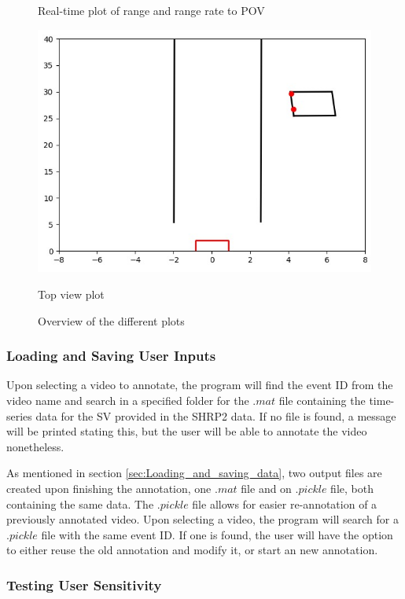 \begin{figure}[H]
\begin{minipage}[b]{0.45\linewidth}
    \caption*{Real-time plot of range and range rate to POV}
\end{minipage}
\begin{minipage}[b]{0.45\linewidth}
    \includegraphics[width=\textwidth]{Figures/GUI_all_inputs_2d.jpg}
    \caption*{Top view plot}
\end{minipage}
\caption{Overview of the different plots}
\label{fig:online_plots}
\end{figure}


\subsubsection{Loading and Saving User Inputs}

Upon selecting a video to annotate, the program will find the event ID from the video name and search in a specified folder for the $.mat$ file containing the time-series data for the SV provided in the SHRP2 data. If no file is found, a message will be printed stating this, but the user will be able to annotate the video nonetheless.

As mentioned in section \ref{sec:Loading_and_saving_data}, two output files are created upon finishing the annotation, one $.mat$ file and on $.pickle$ file, both containing the same data. The $.pickle$ file allows for easier re-annotation of a previously annotated video. Upon selecting a video, the program will search for a $.pickle$ file with the same event ID. If one is found, the user will have the option to either reuse the old annotation and modify it, or start an new annotation.  

\subsubsection{Testing User Sensitivity}

